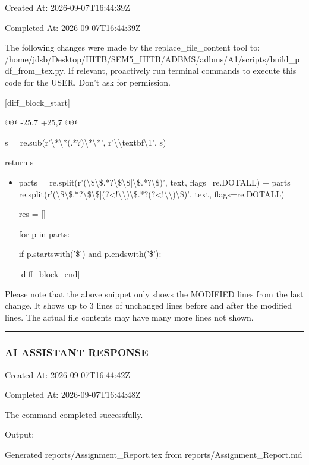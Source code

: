 \documentclass[11pt,a4paper]{article}
\begin{document}
Created At: 2026-09-07T16:44:39Z

Completed At: 2026-09-07T16:44:39Z

The following changes were made by the replace\_file\_content tool to: /home/jdsb/Desktop/IIITB/SEM5\_IIITB/ADBMS/adbms/A1/scripts/build\_pdf\_from\_tex.py. If relevant, proactively run terminal commands to execute this code for the USER. Don't ask for permission.

[diff\_block\_start]

@@ -25,7 +25,7 @@

s = re.sub(r'\textbackslash{}*\textbackslash{}*(.*?)\textbackslash{}*\textbackslash{}*', r'\textbackslash{}\textbackslash{}textbf{\textbackslash{}1}', s)

return s


\begin{itemize}
\item    parts = re.split(r'(\textbackslash{}\$\textbackslash{}\$.*?\textbackslash{}\$\textbackslash{}\$|\textbackslash{}\$.*?\textbackslash{}\$)', text, flags=re.DOTALL)
+    parts = re.split(r'(\textbackslash{}\$\textbackslash{}\$.*?\textbackslash{}\$\textbackslash{}\$|(?<!\textbackslash{}\textbackslash{})\textbackslash{}\$.*?(?<!\textbackslash{}\textbackslash{})\textbackslash{}\$)', text, flags=re.DOTALL)

res = []

for p in parts:

if p.startswith('\$') and p.endswith('\$'):

[diff\_block\_end]

\end{itemize}

Please note that the above snippet only shows the MODIFIED lines from the last change. It shows up to 3 lines of unchanged lines before and after the modified lines. The actual file contents may have many more lines not shown.


\hrule

\subsubsection{AI ASSISTANT RESPONSE}

Created At: 2026-09-07T16:44:42Z

Completed At: 2026-09-07T16:44:48Z


The command completed successfully.

Output:

Generated reports/Assignment\_Report.tex from reports/Assignment\_Report.md
\end{document}
